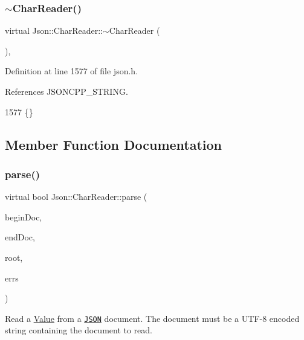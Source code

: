 \subsubsection{\texorpdfstring{$\sim$\+Char\+Reader()}{~CharReader()}}
{\footnotesize\ttfamily virtual Json\+::\+Char\+Reader\+::$\sim$\+Char\+Reader (\begin{DoxyParamCaption}{ }\end{DoxyParamCaption})\hspace{0.3cm}{\ttfamily [inline]}, {\ttfamily [virtual]}}



Definition at line 1577 of file json.\+h.



References J\+S\+O\+N\+C\+P\+P\+\_\+\+S\+T\+R\+I\+NG.


\begin{DoxyCode}
1577 \{\}
\end{DoxyCode}


\subsection{Member Function Documentation}
\mbox{\label{class_json_1_1_char_reader_a7983680d50fd0745f371c43b162e78e1}} 
\subsubsection{\texorpdfstring{parse()}{parse()}}
{\footnotesize\ttfamily virtual bool Json\+::\+Char\+Reader\+::parse (\begin{DoxyParamCaption}\item[{char const $\ast$}]{begin\+Doc,  }\item[{char const $\ast$}]{end\+Doc,  }\item[{\hyperlink{class_json_1_1_value}{Value} $\ast$}]{root,  }\item[{\hyperlink{json_8h_a1e723f95759de062585bc4a8fd3fa4be}{J\+S\+O\+N\+C\+P\+P\+\_\+\+S\+T\+R\+I\+NG} $\ast$}]{errs }\end{DoxyParamCaption})\hspace{0.3cm}{\ttfamily [pure virtual]}}



Read a \hyperlink{class_json_1_1_value}{Value} from a \href{http://www.json.org}{\tt J\+S\+ON} document. The document must be a U\+T\+F-\/8 encoded string containing the document to read. 


